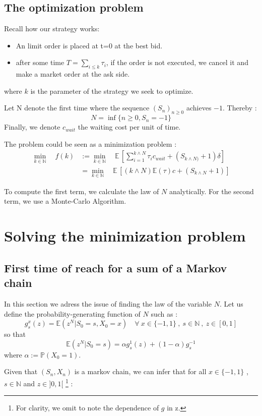 \documentclass{article}
\newcommand{\Min}[2]{ {#1} \wedge {#2} }
\begin{document}
\subsection{The optimization problem}
Recall how our strategy works:
\begin{itemize}
	\item An limit order is placed at t=0 at the best bid.
	\item after some time $T = \sum_{i \leq k} \tau_i$, if the order is not executed, we cancel it and make a market order at the ask side.
\end{itemize}
where $k$ is the parameter of the strategy we seek to optimize. 

Let N denote the first time where the sequence $(S_{n})_{n\geq0}$  achieves $-1$. Thereby :
$$ N= \inf \{ n\geq0 , S_{n}=-1   \} $$
Finally, we denote $c_{wait}$ the waiting cost per unit of time.

The problem could be seen as a minimization problem  :
\begin{align*}
 \min\limits_{k \in \mathbb{N}} \quad f(k) &:= \min\limits_{k \in \mathbb{N}} \quad \mathbb{E}\,\left[ \sum_{i=1}^{\Min k N}\tau_i c_{wait} + (S_{\Min k N)}+1)\delta\right] \\
&= \min\limits_{k \in \mathbb{N}} \quad \mathbb{E}\,\left[ ({\Min k N})  \mathbb{E}(\tau) c + (S_{\Min k N}+1) \right]
\end{align*}

To compute the first term, we calculate the law of $N$ analytically. For the second term, we use a Monte-Carlo Algorithm.

\newpage
\section{Solving the minimization problem}
\subsection{First time of reach for a sum of a Markov chain}
In this section we adress the issue of finding the law of the variable $N$. Let us define the  probability-generating function of $N$ such as :
$$ g_{s}^{x}(z) = \mathbb{E}(z^{N} | S_0=s, X_0=x) \quad \forall \ x \in \{-1,1\} \ , \ s \in \mathbb{N} \ , \ z \in [0,1]  $$
so that
$$\mathbb{E}(z^{N} | S_0=s) = \alpha  g_{s}^{1}(z) + (1-\alpha) g_{s}^{-1} $$
where $\alpha := \mathbb{P}(X_0 = 1)$.

Given that $(S_n, X_n)$ is a markov chain, we can infer that for all $x \in \{-1,1\}$ , $s \in \mathbb{N}$ and $z \in ]0,1[$ \footnote{For clarity, we omit to note the dependence of $g$ in z.} :
\end{document}
